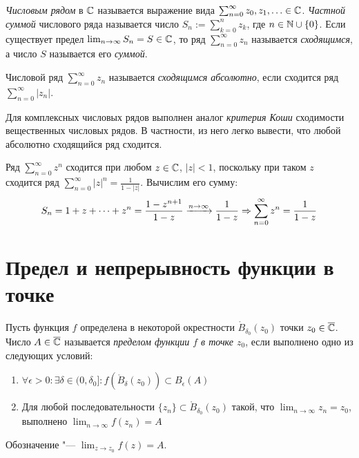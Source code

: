 \begin{definition}
	\textit{Числовым рядом} в $\mathbb{C}$ называется выражение вида $\sum_{n = 0}^\infty z_0, z_1, \dotsc \in \mathbb{C}$. \textit{Частной суммой} числового ряда называется число $S_n := \sum_{k = 0}^nz_k$, где $n \in \mathbb{N} \cup \{0\}$. Если существует предел $\lim_{n \to \infty}S_n = S \in \mathbb{C}$, то ряд $\sum_{n = 0}^\infty z_n$ называется \textit{сходящимся}, а число $S$ называется его \textit{суммой}.
\end{definition}

\begin{definition}
	Числовой ряд $\sum_{n = 0}^\infty z_n$ называется \textit{сходящимся абсолютно}, если сходится ряд $\sum_{n = 0}^\infty|z_n|$.
\end{definition}

\begin{note}
	Для комплексных числовых рядов выполнен аналог \textit{критерия Коши} сходимости вещественных числовых рядов. В частности, из него легко вывести, что любой абсолютно сходящийся ряд сходится.
\end{note}

\begin{example}
	Ряд $\sum_{n=0}^\infty z^n$ сходится при любом $z \in \mathbb{C}$, $|z| < 1$, поскольку при таком $z$ сходится ряд $\sum_{n=0}^\infty |z|^n = \frac1{1-|z|}$. Вычислим его сумму:
	\[S_n = 1 + z + \dotsb + z^n = \frac{1-z^{n+1}}{1-z} \xrightarrow{n \to \infty} \frac1{1-z} \Rightarrow \sum_{n=0}^\infty z^n = \frac1{1-z}\]
\end{example}

\section{Предел и непрерывность функции в точке}

\begin{definition}
	Пусть функция $f$ определена в некоторой окрестности $\mathring B_{\delta_0}(z_0)$ точки $z_0 \in \overline{\mathbb{C}}$. Число $A \in \overline{\mathbb{C}}$ называется \textit{пределом функции $f$ в точке $z_0$}, если выполнено одно из следующих условий:
	\begin{enumerate}
		\item $\forall \epsilon > 0: \exists \delta \in (0, \delta_0]: f(\mathring B_\delta(z_0)) \subset B_\epsilon(A)$
		\item Для любой последовательности $\{z_n\} \subset \mathring B_{\delta_0}(z_0)$ такой, что $\lim_{n \to \infty}z_n = z_0$, выполнено $\lim_{n \to \infty}f(z_n) = A$
	\end{enumerate}
	
	Обозначение "--- $\lim_{z \to z_0}f(z) = A$.
\end{definition}

